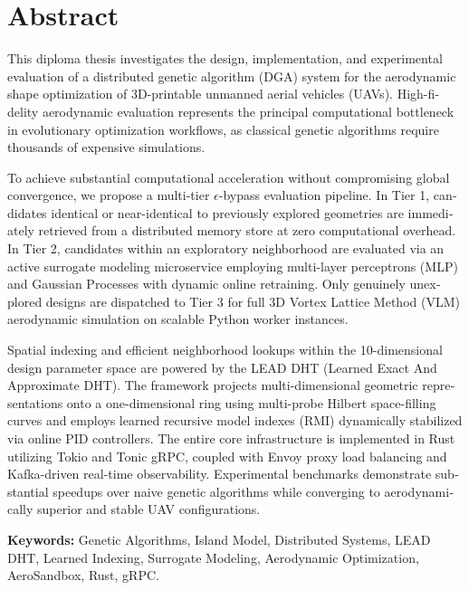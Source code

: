
\chapter*{Abstract}

\begin{otherlanguage}{english}
This diploma thesis investigates the design, implementation, and experimental evaluation of a distributed genetic algorithm (DGA) system for the aerodynamic shape optimization of 3D-printable unmanned aerial vehicles (UAVs). High-fidelity aerodynamic evaluation represents the principal computational bottleneck in evolutionary optimization workflows, as classical genetic algorithms require thousands of expensive simulations.

To achieve substantial computational acceleration without compromising global convergence, we propose a multi-tier $\epsilon$-bypass evaluation pipeline. In Tier 1, candidates identical or near-identical to previously explored geometries are immediately retrieved from a distributed memory store at zero computational overhead. In Tier 2, candidates within an exploratory neighborhood are evaluated via an active surrogate modeling microservice employing multi-layer perceptrons (MLP) and Gaussian Processes with dynamic online retraining. Only genuinely unexplored designs are dispatched to Tier 3 for full 3D Vortex Lattice Method (VLM) aerodynamic simulation on scalable Python worker instances.

Spatial indexing and efficient neighborhood lookups within the 10-dimensional design parameter space are powered by the LEAD DHT (Learned Exact And Approximate DHT). The framework projects multi-dimensional geometric representations onto a one-dimensional ring using multi-probe Hilbert space-filling curves and employs learned recursive model indexes (RMI) dynamically stabilized via online PID controllers. The entire core infrastructure is implemented in Rust utilizing Tokio and Tonic gRPC, coupled with Envoy proxy load balancing and Kafka-driven real-time observability. Experimental benchmarks demonstrate substantial speedups over naive genetic algorithms while converging to aerodynamically superior and stable UAV configurations.

\vspace{1.2cm}

\noindent \textbf{Keywords:} Genetic Algorithms, Island Model, Distributed Systems, LEAD DHT, Learned Indexing, Surrogate Modeling, Aerodynamic Optimization, AeroSandbox, Rust, gRPC.
\end{otherlanguage}

\clearemptydoublepage
